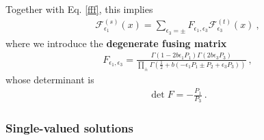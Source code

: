 \documentclass[12pt, a4paper, notitlepage, twoside]{report}
\numberwithin{equation}{section}
\theoremstyle{break}
\begin{document}
Together with Eq. \eqref{fff}, this implies 
\begin{align}
 \mathcal{F}^{(s)}_{\epsilon_1}(x) = \sum_{\epsilon_3=\pm} F_{\epsilon_1,\epsilon_3} \mathcal{F}^{(t)}_{\epsilon_3}(x)\ ,
\label{gfg}
\end{align}
where we introduce the \textbf{degenerate fusing matrix} 
\begin{align}
F_{\epsilon_1,\epsilon_3} = \frac{\Gamma(1-2b\epsilon_1P_1)\Gamma(2b\epsilon_3P_3)}{\prod_\pm \Gamma(\frac12+b(-\epsilon_1P_1\pm P_2+\epsilon_3P_3))}\ ,
\label{fmd}
\end{align}
whose determinant is 
\begin{align}
 \det F = -\frac{P_1}{P_3}\ .
\label{detf}
\end{align}

\subsubsection{Single-valued solutions}
\end{document}
